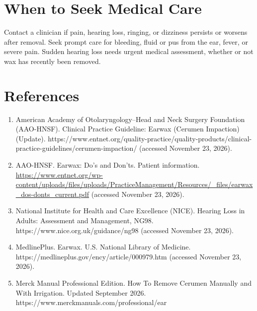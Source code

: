 \section*{When to Seek Medical Care}
Contact a clinician if pain, hearing loss, ringing, or dizziness persists or worsens after removal. Seek prompt care for bleeding, fluid or pus from the ear, fever, or severe pain. Sudden hearing loss needs urgent medical assessment, whether or not wax has recently been removed.

\section*{References}
\begin{enumerate}
  \item American Academy of Otolaryngology--Head and Neck Surgery Foundation (AAO-HNSF). Clinical Practice Guideline: Earwax (Cerumen Impaction) (Update). https://www.entnet.org/quality-practice/quality-products/clinical-practice-guidelines/cerumen-impaction/ (accessed November 23, 2026).
  \item AAO-HNSF. Earwax: Do's and Don'ts. Patient information. \url{https://www.entnet.org/wp-content/uploads/files/uploads/PracticeManagement/Resources/_files/earwax_dos-donts_current.pdf} (accessed November 23, 2026).
  \item National Institute for Health and Care Excellence (NICE). Hearing Loss in Adults: Assessment and Management, NG98. https://www.nice.org.uk/guidance/ng98 (accessed November 23, 2026).
  \item MedlinePlus. Earwax. U.S. National Library of Medicine. https://medlineplus.gov/ency/article/000979.htm (accessed November 23, 2026).
  \item Merck Manual Professional Edition. How To Remove Cerumen Manually and With Irrigation. Updated September 2026. https://www.merckmanuals.com/professional/ear%
\end{enumerate}

\clearpage
